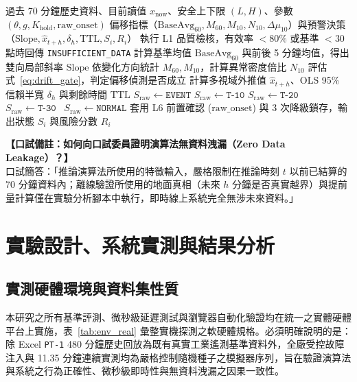 \documentclass[fontset=none, a4paper, 12pt]{ctexart}
\begin{document}
\begin{doublespace}
\begin{algorithm}[H]
\caption{統一偏移偵測與趨勢預測七層工業硬化演算法 (Unified V1)}
\label{alg:unified_v1}
\begin{algorithmic}[1]
\Require 過去 70 分鐘歷史資料、目前讀值 $x_{\mathrm{now}}$、安全上下限 $(L, H)$、參數 $(\theta, g, K_{\mathrm{hold}}, \text{raw\_onset})$
\Ensure 偏移指標（$\mathrm{BaseAvg}_{60}, M_{60}, M_{10}, N_{10}, \Delta\mu_{10}$）與預警決策（$\mathrm{Slope}, \hat{x}_{t+h}, \delta_h, \mathrm{TTL}, S_i, R_i$）
\State 執行 L1 品質檢核，有效率 $<80\%$ 或基準 $<30$ 點時回傳 \texttt{INSUFFICIENT\_DATA}
\State 計算基準均值 $\mathrm{BaseAvg}_{60}$ 與前後 5 分鐘均值，得出雙向局部斜率 $\mathrm{Slope}$ 
\State 依變化方向統計 $M_{60}, M_{10}$，計算異常密度倍比 $N_{10}$ 
\State 評估式~\eqref{eq:drift_gate}，判定偏移偵測是否成立 
\State 計算多視域外推值 $\hat{x}_{t+h}$、OLS 95\% 信賴半寬 $\delta_h$ 與剩餘時間 $\mathrm{TTL}$ 
 $S_{\mathrm{raw}} \leftarrow \texttt{EVENT}$ 
 $S_{\mathrm{raw}} \leftarrow \texttt{T-10}$
 $S_{\mathrm{raw}} \leftarrow \texttt{T-20}$
 $S_{\mathrm{raw}} \leftarrow \texttt{T-30}$
\Else\ $S_{\mathrm{raw}} \leftarrow \texttt{NORMAL}$
\EndIf
\State 套用 L6 前置確認 ($\text{raw\_onset}$) 與 3 次降級鎖存，輸出狀態 $S_i$ 與風險分數 $R_i$
\end{algorithmic}
\end{algorithm}

\noindent\textbf{【口試備註：如何向口試委員證明演算法無資料洩漏（Zero Data Leakage）？】}\\
口試簡答：「推論演算法所使用的特徵輸入，嚴格限制在推論時刻 $t$ 以前已結算的 70 分鐘資料內；離線驗證所使用的地面真相（未來 $h$ 分鐘是否真實越界）與提前量計算僅在實驗分析腳本中執行，即時線上系統完全無涉未來資料。」

\clearpage
\section{實驗設計、系統實測與結果分析}

\subsection{實測硬體環境與資料集性質}
本研究之所有基準評測、微秒級延遲測試與瀏覽器自動化驗證均在統一之實體硬體平台上實施，表~\ref{tab:env_real} 彙整實機探測之軟硬體規格。必須明確說明的是：除 Excel \texttt{PT-1} 480 分鐘歷史回放為既有真實工業遙測基準資料外，全廠受控故障注入與 11.35 分鐘連續實測均為嚴格控制隨機種子之模擬器序列，旨在驗證演算法與系統之行為正確性、微秒級即時性與無資料洩漏之因果一致性。


\end{doublespace}
\end{document}
